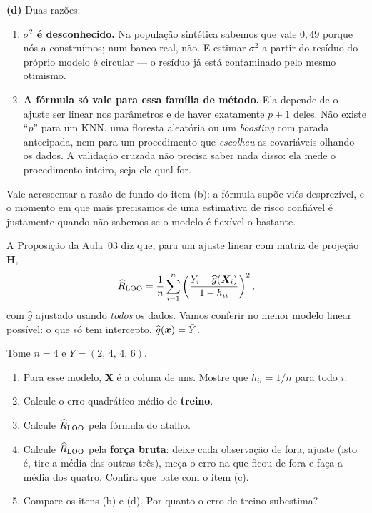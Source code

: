 \documentclass[11pt,a4paper]{article}
\begin{document}
\begin{solucao}
\smallskip
\textbf{(d)} Duas razões:
\begin{enumerate}[label=(\roman*),leftmargin=1.1cm]
  \item \textbf{$\sigma^2$ é desconhecido.} Na população sintética sabemos que
        vale $0{,}49$ porque nós a construímos; num banco real, não. E estimar
        $\sigma^2$ a partir do resíduo do próprio modelo é circular --- o resíduo
        já está contaminado pelo mesmo otimismo.
  \item \textbf{A fórmula só vale para essa família de método.} Ela depende de o
        ajuste ser linear nos parâmetros e de haver exatamente $p+1$ deles. Não
        existe ``$p$'' para um KNN, uma floresta aleatória ou um \emph{boosting}
        com parada antecipada, nem para um procedimento que \emph{escolheu} as
        covariáveis olhando os dados. A validação cruzada não precisa saber nada
        disso: ela mede o procedimento inteiro, seja ele qual for.
\end{enumerate}
Vale acrescentar a razão de fundo do item (b): a fórmula supõe viés desprezível,
e o momento em que mais precisamos de uma estimativa de risco confiável é
justamente quando não sabemos se o modelo é flexível o bastante.
\end{solucao}

\begin{exercicio}
A Proposição da Aula~03 diz que, para um ajuste linear com matriz de projeção
$\bm H$,
\[
  \widehat{R}_{\text{LOO}}
   = \frac1n\sum_{i=1}^n\left(\frac{Y_i-\widehat g(\bm{X}_i)}{1-h_{ii}}\right)^2 ,
\]
com $\widehat g$ ajustado usando \emph{todos} os dados. Vamos conferir no menor
modelo linear possível: o que só tem intercepto, $\widehat g(\bm{x})=\bar Y$.

Tome $n=4$ e $Y=(2,\,4,\,4,\,6)$.
\begin{enumerate}[label=(\alph*),leftmargin=1.1cm]
  \item Para esse modelo, $\bm X$ é a coluna de uns. Mostre que
        $h_{ii}=1/n$ para todo $i$.
  \item Calcule o erro quadrático médio de \textbf{treino}.
  \item Calcule $\widehat{R}_{\text{LOO}}$ pela fórmula do atalho.
  \item Calcule $\widehat{R}_{\text{LOO}}$ pela \textbf{força bruta}: deixe cada
        observação de fora, ajuste (isto é, tire a média das outras três), meça o
        erro na que ficou de fora e faça a média dos quatro. Confira que bate com
        o item (c).
  \item Compare os itens (b) e (d). Por quanto o erro de treino subestima?
\end{enumerate}
\end{exercicio}
\end{document}

